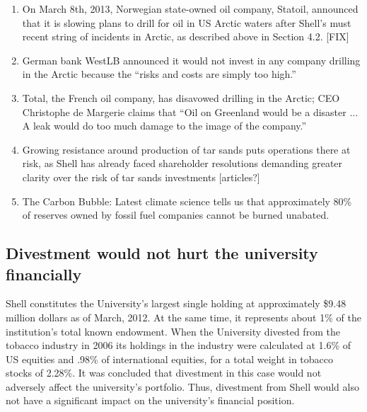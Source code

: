 \begin{enumerate}
	\item On March 8th, 2013, Norwegian state-owned oil company, Statoil, announced that it is slowing plans to drill for oil in US Arctic waters after Shell’s must recent string of incidents in Arctic, as described above in Section 4.2. [FIX]
	\item German bank WestLB announced it would not invest in any company drilling in the Arctic because the ``risks and costs are simply too high.''
	\item Total, the French oil company, has disavowed drilling in the Arctic; CEO Christophe de Margerie claims that ``Oil on Greenland would be a disaster ... A leak would do too much damage to the image of the company.''
	\item Growing resistance around production of tar sands puts operations there at risk, as Shell has already faced shareholder resolutions demanding greater clarity over the risk of tar sands investments [articles?]
	\item The Carbon Bubble: Latest climate science tells us that approximately 80\% of reserves owned by fossil fuel companies cannot be burned unabated.
\end{enumerate}


	\subsection{Divestment would not hurt the university financially}
	


Shell constitutes the University’s largest single holding at approximately \$9.48 million dollars as of March, 2012.  
At the same time, it represents about 1\% of the institution’s total known endowment. 
When the University divested from the tobacco industry in 2006 its holdings in the industry were calculated at 1.6\% of US equities and .98\% of international equities, for a total weight in tobacco stocks of 2.28\%.  
It was concluded that divestment in this case would not adversely affect the university’s portfolio. 
Thus, divestment from Shell would also not have a significant impact on the university’s financial position. 






